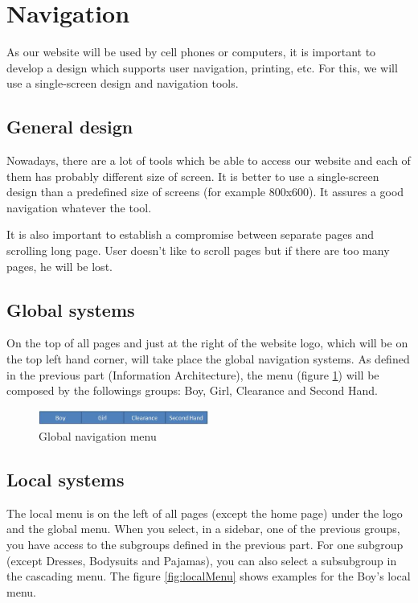 \section{Navigation}

As our website will be used by cell phones or computers, it is important to develop a design which supports user navigation, printing, etc. For this, we will use a single-screen design and navigation tools.

\subsection{General design}

Nowadays, there are a lot of tools which be able to access our website and each of them has probably different size of screen. It is better to use a single-screen design than a predefined size of screens (for example 800x600). It assures a good navigation whatever the tool. 

It is also important to establish a compromise between separate pages and scrolling long page. User doesn't like to scroll pages but if there are too many pages, he will be lost.


\subsection{Global systems}

On the top of all pages and just at the right of the website logo, which will be on the top left hand corner, will take place the global navigation systems. As defined in the previous part (Information Architecture), the menu (figure \ref{fig:globalMenu}) will be composed by the followings groups: Boy, Girl, Clearance and Second Hand.

\begin{figure}[h!]
  \centering  
  \includegraphics[width=0.5\textwidth]{Images/globalMenu.jpg}                
  \caption{Global navigation menu}
  \label{fig:globalMenu}
\end{figure}


\subsection{Local systems}
The local menu is on the left of all pages (except the home page) under the logo and the global menu. When you select, in a sidebar, one of the previous groups, you have access to the subgroups defined in the previous part. For one subgroup (except Dresses, Bodysuits and Pajamas), you can also select a subsubgroup in the cascading menu. The figure \ref{fig:localMenu} shows examples for the Boy's local menu.

